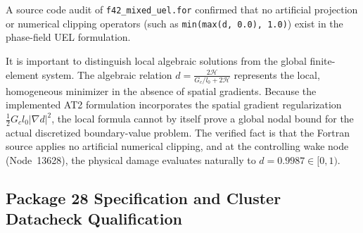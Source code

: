 A source code audit of \texttt{f42\_mixed\_uel.for} confirmed that no artificial projection or numerical clipping operators (such as \texttt{min(max(d, 0.0), 1.0)}) exist in the phase-field UEL formulation. 

It is important to distinguish local algebraic solutions from the global finite-element system. The algebraic relation $d = \frac{2\mathcal{H}}{G_c/l_0 + 2\mathcal{H}}$ represents the local, homogeneous minimizer in the absence of spatial gradients. Because the implemented AT2 formulation incorporates the spatial gradient regularization $\frac{1}{2} G_c l_0 |\nabla d|^2$, the local formula cannot by itself prove a global nodal bound for the actual discretized boundary-value problem. The verified fact is that the Fortran source applies no artificial numerical clipping, and at the controlling wake node (Node~13628), the physical damage evaluates naturally to $d = 0.9987 \in [0, 1)$.

\subsection{Package 28 Specification and Cluster Datacheck Qualification}
\label{subsec:stage14uah_package28_qualification}

